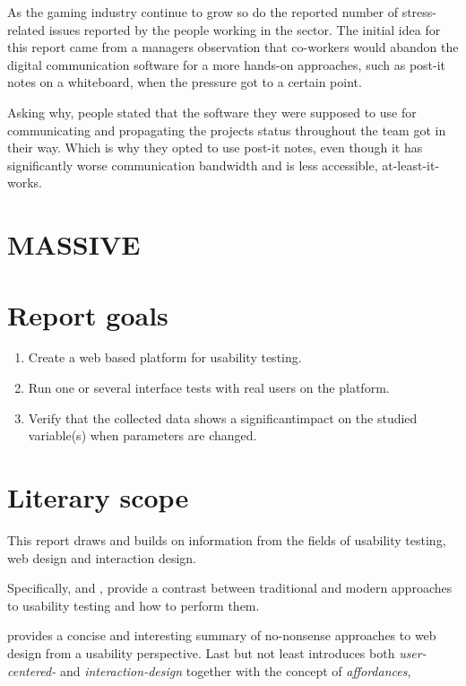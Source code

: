 As the gaming industry continue to grow{\findref\findref} so do the reported
number of stress-related issues reported by the people working in the
sector{\findref\findref\findref}. The initial idea for this report came from a managers
observation that co-workers would abandon the digital communication software
for a more hands-on approaches, such as post-it notes on a whiteboard, when
the pressure got to a certain point.

Asking why, people stated that the software they were supposed to use for
communicating and propagating the projects status throughout the team got in
their way. Which is why they opted to use post-it notes, even though it has
significantly worse communication bandwidth and is less accessible,
at-least-it-works\texttrademark.

\section[MASSIVE Entertainment | A Ubisoft studio]{MASSIVE}

{}


\section{Report goals}

  \begin{enumerate}
    \item{Create a web based platform for usability testing.}
    \item{Run one or several interface tests with real users on the platform.}
    \item{
      Verify that the collected data shows a significant\checkTruth impact on the studied
      variable(s) when parameters are changed. 
    }
  \end{enumerate}

\section{Literary scope}

  This report draws and builds on information from the fields of usability
  testing, web design and interaction design.

  Specifically,  and
  , provide a contrast between
  traditional and modern approaches to usability testing and how to perform
  them.

   provides a concise and interesting
  summary of no-nonsense approaches to web design from a usability perspective.
  Last but not least  introduces
  both \textit{user-centered-} and \textit{interaction-design} together
  with the concept of \textit{affordances},
